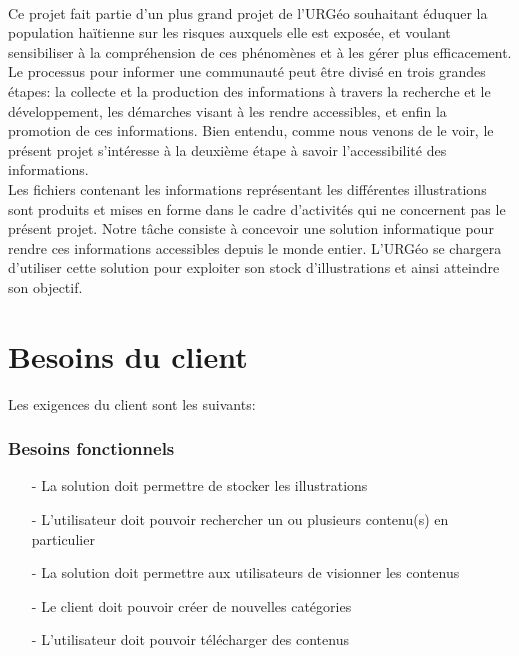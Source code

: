 \paragraph{}Ce projet fait partie d'un plus grand projet de l'URG\'eo souhaitant \'eduquer la population ha\"itienne sur les risques auxquels elle est expos\'ee, et voulant sensibiliser \`a la compr\'ehension de ces ph\'enom\`enes et \`a les g\'erer plus efficacement. \\
Le processus pour informer une communaut\'e peut \^etre divis\'e en trois grandes \'etapes: la collecte et la production des informations \`a travers la recherche et le d\'eveloppement, les d\'emarches visant \`a  les rendre accessibles, et enfin la promotion de ces informations. Bien entendu, comme nous venons de le voir, le pr\'esent projet s'int\'eresse \`a la deuxi\`eme \'etape \`a savoir l'accessibilit\'e des informations. \\
Les fichiers contenant les informations repr\'esentant les diff\'erentes illustrations sont produits et mises en forme dans le cadre d'activit\'es qui ne concernent pas le pr\'esent projet. Notre t\^ache consiste \`a concevoir une solution informatique pour rendre ces informations accessibles depuis le monde entier. L'URG\'eo se chargera d'utiliser cette solution pour exploiter son stock d'illustrations et ainsi atteindre son objectif.




	\section*{Besoins du client}

		Les exigences du client sont les suivants:

		\subsubsection*{Besoins fonctionnels}
		\label{SectionBesoinsFonctionnels}
			\begin{itemize}
				\item[-] La solution doit permettre de stocker les illustrations
				\item[-] L'utilisateur doit pouvoir rechercher un ou plusieurs contenu(s) en particulier
				\item[-] La solution doit permettre aux utilisateurs de visionner les contenus
				\item[-] Le client doit pouvoir cr\'eer de nouvelles cat\'egories
				\item[-] L'utilisateur doit pouvoir t\'el\'echarger des contenus
			\end{itemize}

